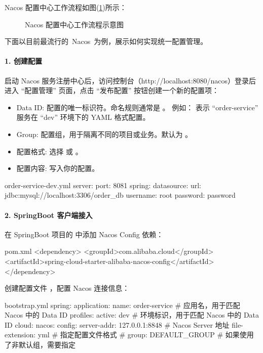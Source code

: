 Nacos 配置中心工作流程如图(\ref{fig:nacos-config-workflow})所示：
\begin{figure}[h]
    \centering
    
    \caption{Nacos 配置中心工作流程示意图}
    \label{fig:nacos-config-workflow}
\end{figure}

下面以目前最流行的 Nacos 为例，展示如何实现统一配置管理。

\paragraph{1. 创建配置}
启动 Nacos 服务注册中心后，访问控制台（http://localhost:8080/nacos）登录后进入 ``配置管理'' 页面，点击 ``发布配置'' 按钮创建一个新的配置项：
\begin{itemize}
    \item Data ID: 配置的唯一标识符。命名规则通常是
        \newline{}。
        \newline 例如： 表示 ``order-service'' 服务在 ``dev'' 环境下的 YAML 格式配置。
    \item Group: 配置组，用于隔离不同的项目或业务。默认为 。
    \item 配置格式: 选择  或 。
    \item 配置内容: 写入你的配置。
\end{itemize}
\begin{codeblock}[yml]{order-service-dev.yml}
server:
    port: 8081
spring:
    datasource:
        url: jdbc:mysql://localhost:3306/order_db
        username: root
        password: password
\end{codeblock}

\paragraph{2. SpringBoot 客户端接入}
在 SpringBoot 项目的  中添加 Nacos Config 依赖：
\begin{codeblock}[xml]{pom.xml}
<dependency>
    <groupId>com.alibaba.cloud</groupId>
    <artifactId>spring-cloud-starter-alibaba-nacos-config</artifactId>
</dependency>
\end{codeblock}
创建配置文件 ，配置 Nacos 连接信息：
\begin{codeblock}[yml]{bootstrap.yml}
spring:
    application:
        name: order-service # 应用名，用于匹配 Nacos 中的 Data ID
    profiles:
        active: dev # 环境标识，用于匹配 Nacos 中的 Data ID
    cloud:
        nacos:
            config:
                server-addr: 127.0.0.1:8848 # Nacos Server 地址
                file-extension: yml # 指定配置文件格式
                # group: DEFAULT_GROUP # 如果使用了非默认组，需要指定
\end{codeblock}

